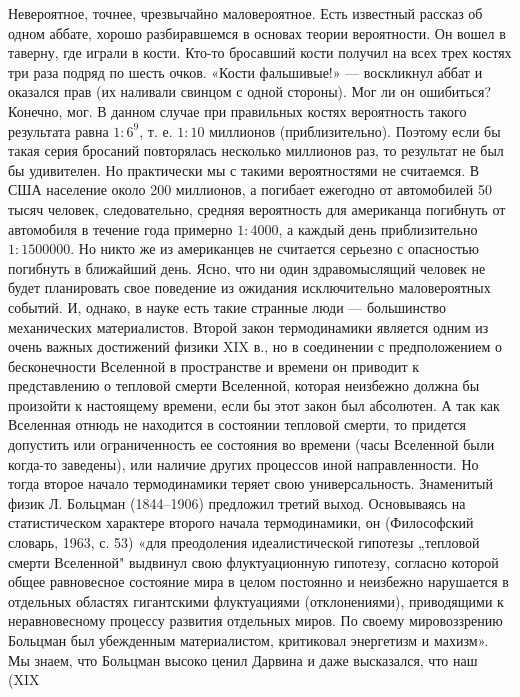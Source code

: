 Невероятное, точнее, чрезвычайно маловероятное. Есть известный рассказ
об одном аббате, хорошо разбиравшемся в основах теории вероятности. Он
вошел в таверну, где играли в кости. Кто-то бросавший кости получил на
всех трех  костях три раза  подряд по шесть очков.  «Кости фальшивые!»
---  воскликнул аббат  и оказался  прав (их  наливали свинцом  с одной
стороны).  Мог ли  он ошибиться?  Конечно,  мог. В  данном случае  при
правильных  костях вероятность  такого  результата  равна $1:6^9$,  т.
е.  $1:10$ миллионов  (приблизительно).  Поэтому если  бы такая  серия
бросаний повторялась несколько  миллионов раз, то результат  не был бы
удивителен. Но практически  мы с такими вероятностями  не считаемся. В
США население около 200 миллионов,  а погибает ежегодно от автомобилей
50 тысяч  человек, следовательно,  средняя вероятность  для американца
погибнуть от  автомобиля в  течение года  примерно $1:4000$,  а каждый
день приблизительно  $1 : 1  500 000$. Но  никто же из  американцев не
считается серьезно с опасностью погибнуть  в ближайший день. Ясно, что
ни один здравомыслящий человек не  будет планировать свое поведение из
ожидания исключительно маловероятных событий.  И, однако, в науке есть
такие странные люди --- большинство механических материалистов. Второй
закон термодинамики  является одним из очень  важных достижений физики
XIX в., но  в соединении с предположением о  бесконечности Вселенной в
пространстве и времени  он приводит к представлению  о тепловой смерти
Вселенной, которая неизбежно должна бы произойти к настоящему времени,
если  бы  этот  закон  был  абсолютен.  А  так  как  Вселенная  отнюдь
не  находится  в  состоянии  тепловой смерти,  то  придется  допустить
или  ограниченность  ее  состояния  во времени  (часы  Вселенной  были
когда-то заведены), или наличие  других процессов иной направленности.
Но  тогда второе  начало  термодинамики  теряет свою  универсальность.
Знаменитый  физик Л.  Больцман  (1844--1906)  предложил третий  выход.
Основываясь на статистическом  характере второго начала термодинамики,
он (Философский словарь, 1963, с. 53) «для преодоления идеалистической
гипотезы  „тепловой  смерти  Вселенной" выдвинул  свою  флуктуационную
гипотезу, согласно  которой общее  равновесное состояние мира  в целом
постоянно  и неизбежно  нарушается  в  отдельных областях  гигантскими
флуктуациями  (отклонениями),  приводящими к  неравновесному  процессу
развития  отдельных  миров.  По   своему  мировоззрению  Больцман  был
убежденным материалистом,  критиковал энергетизм и махизм».  Мы знаем,
что  Больцман высоко  ценил Дарвина  и даже  высказался, что  наш (XIX

